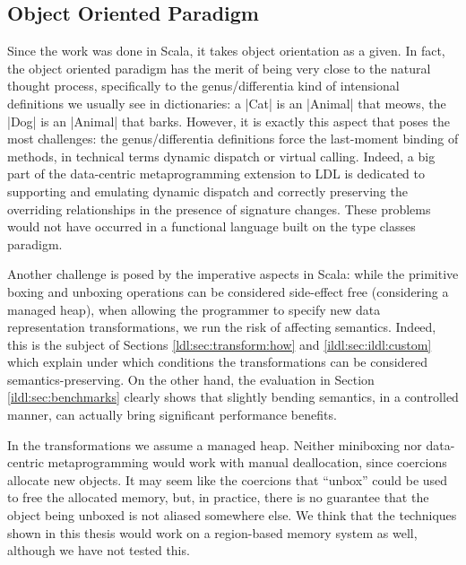\subsection{Object Oriented Paradigm}



Since the work was done in Scala, it takes object orientation as a given. In fact, the object oriented paradigm has the merit of being very close to the natural thought process, specifically to the genus/differentia kind of intensional definitions we usually see in dictionaries: a |Cat| is an |Animal| that meows, the |Dog| is an |Animal| that barks. However, it is exactly this aspect that poses the most challenges: the genus/differentia definitions force the last-moment binding of methods, in technical terms dynamic dispatch or virtual calling. Indeed, a big part of the data-centric metaprogramming extension to LDL is dedicated to supporting and emulating dynamic dispatch and correctly preserving the overriding relationships in the presence of signature changes. These problems would not have occurred in a functional language built on the type classes paradigm.

Another challenge is posed by the imperative aspects in Scala: while the primitive boxing and unboxing operations can be considered side-effect free (considering a managed heap), when allowing the programmer to specify new data representation transformations, we run the risk of affecting semantics. Indeed, this is the subject of Sections \ref{ldl:sec:transform:how} and \ref{ildl:sec:ildl:custom} which explain under which conditions the transformations can be considered semantics-preserving. On the other hand, the evaluation in Section \ref{ildl:sec:benchmarks} clearly shows that slightly bending semantics, in a controlled manner, can actually bring significant performance benefits.

In the transformations we assume a managed heap. Neither miniboxing nor data-centric metaprogramming would work with manual deallocation, since coercions allocate new objects. It may seem like the coercions that ``unbox'' could be used to free the allocated memory, but, in practice, there is no guarantee that the object being unboxed is not aliased somewhere else. We think that the techniques shown in this thesis would work on a region-based \cite{regions} memory system as well, although we have not tested this.


